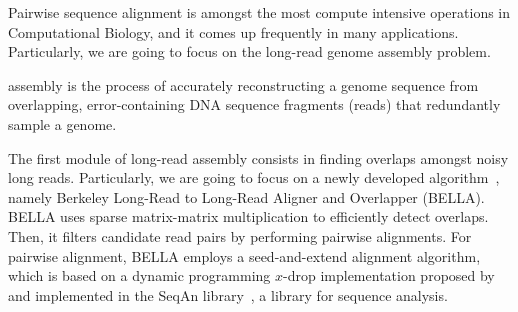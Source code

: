 \justify
Pairwise sequence alignment is amongst the most compute intensive operations in Computational Biology, and it comes up frequently in many applications. 
Particularly, we are going to focus on the \denovo long-read genome assembly problem.

\Denovo assembly is the process of accurately reconstructing a genome sequence from overlapping, error-containing DNA sequence fragments (reads) that redundantly sample a genome. 

The first module of \denovo long-read assembly consists in finding overlaps amongst noisy long reads.
Particularly, we are going to focus on a newly developed algorithm~\citep{guidi2018bella}, namely Berkeley Long-Read to Long-Read Aligner and Overlapper (BELLA).
BELLA uses sparse matrix-matrix multiplication to efficiently detect overlaps.
Then, it filters candidate read pairs by performing pairwise alignments.
For pairwise alignment, BELLA employs a seed-and-extend alignment algorithm, which is based on a dynamic programming $x$-drop implementation proposed by~\citet{zhang2000greedy} and implemented in the SeqAn library~\citep{doring2008seqan}, a \CC library for sequence analysis. 

